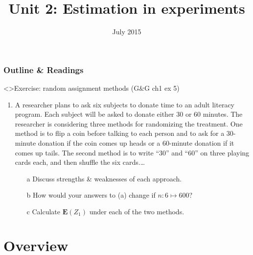 %

%






\title{Unit 2: Estimation in experiments}
\date{July 2015}




  \begin{frame}
    \frametitle{Outline \& Readings}

\tableofcontents[subsectionstyle=show/hide/hide]

\end{frame}


\begin{frame}<\nottheirhandout>{Exercise: random assignment methods}
{\footnotesize (G\&G ch1 ex 5)}

\begin{enumerate} \addtocounter{enumi}{-1}
\item
A researcher plans to ask six subjects to donate time to an adult
literacy program. Each subject will be asked to donate either 30 or 60
minutes. The researcher is considering three methods for randomizing
the treatment. One method is to flip a coin before talking to each
person and to ask for a 30-minute donation if the coin comes up heads
or a 60-minute donation if it comes up tails. The second method is to
write ``30'' and ``60'' on three playing cards each, and then shuffle
the six cards.\ldots
  
\begin{itemize}
\item[a] Discuss strengths \& weaknesses of each approach.
\item[b] How would your answers to (a) change if $n: 6 \mapsto 600$?
\item[c] Calculate $\mathbf{E}(Z_{1})$ under each of the two methods.
\end{itemize}
\end{enumerate}

\end{frame}


\section{Overview}



